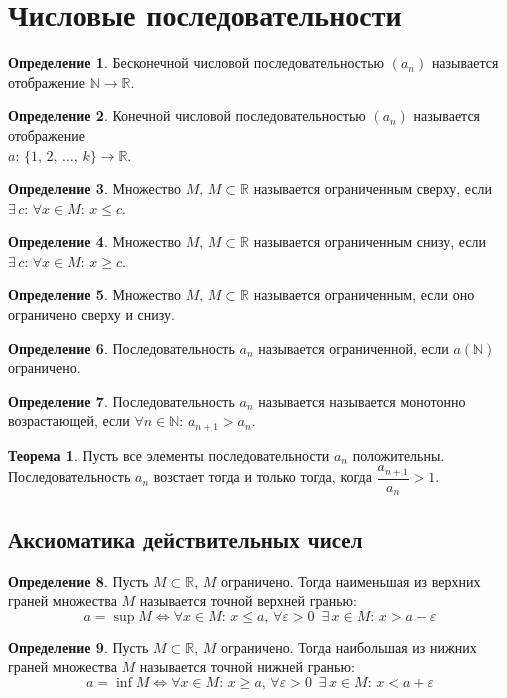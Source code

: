 \documentclass[12pt]{article}
\theoremstyle{definition}
\newtheorem{theorem}{Теорема}[section]
\newtheorem{definition}{Определение}
\newcommand{\N}{\mathbb{N}}
\newcommand{\R}{\mathbb{R}}
\begin{document}
\section{Числовые последовательности}
\begin{definition}
    Бесконечной числовой последовательностью $(a_n)$ называется отображение $\N \rightarrow \R$.
\end{definition}
\begin{definition}
    Конечной числовой последовательностью $(a_n)$ называется отображение\\ $a:\,\{1,\,2,\,\ldots,\,k\}\rightarrow \R$.
\end{definition}

\begin{definition}
    Множество $M,\,M\subset\R$ называется ограниченным сверху, если $\exists\, c:\,\forall x\in M:\,x \leq c$.
\end{definition}
\begin{definition}
    Множество $M,\,M\subset\R$ называется ограниченным снизу, если $\exists\, c:\,\forall x\in M:\,x \geq c$.
\end{definition}
\begin{definition}
    Множество $M,\,M\subset\R$ называется ограниченным, если оно ограничено сверху и снизу.
\end{definition}
\begin{definition}
    Последовательность $a_n$ называется ограниченной, если $a(\N)$ ограничено. 
\end{definition}
\begin{definition}
    Последовательность $a_n$ называется называется монотонно возрастающей, если $\forall n \in \N:\, a_{n+1}>a_n$.
\end{definition}
\begin{theorem}
    Пусть все элементы последовательности $a_n$ положительны. Последовательность $a_n$ возстает тогда и только тогда, когда $\dfrac{a_{n+1}}{a_n}>1$.
\end{theorem}

\subsection{Аксиоматика действительных чисел}

\begin{definition}
    Пусть $M \subset \R,\,M$ ограничено. Тогда наименьшая из верхних граней множества $M$ называется точной верхней гранью:
    $$a=\sup M\Longleftrightarrow \forall x \in M:\, x \leq a,\, \forall \varepsilon>0\,\,\, \exists\, x \in M:\, x>a-\varepsilon$$
\end{definition}
\begin{definition}
    Пусть $M \subset \R,\,M$ ограничено. Тогда наибольшая из нижних граней множества $M$ называется точной нижней гранью:
    $$a=\inf M\Longleftrightarrow \forall x \in M:\, x \geq a,\, \forall \varepsilon>0\,\,\, \exists\, x \in M:\, x<a+\varepsilon$$
\end{definition}
\end{document}
